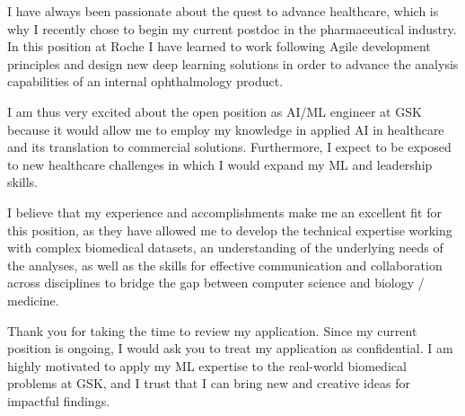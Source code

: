\documentclass[10pt, letter]{ag-cv} %
\begin{document}
\begin{cvletter}
\begin{flushleft}
I have always been passionate about the quest to advance healthcare, which is why I recently chose to begin my current postdoc in the pharmaceutical industry. In this position at Roche I have learned to work following Agile development principles and design new deep learning solutions in order to advance the analysis capabilities of an internal ophthalmology product. 

I am thus very excited about the open position as AI/ML engineer at GSK because it would allow me to employ my knowledge in applied AI in healthcare and its translation to commercial solutions. Furthermore, I expect to be exposed to new healthcare challenges in which I would expand my ML and leadership skills. 

I believe that my experience and accomplishments make me an excellent fit for this position, as they have allowed me to develop the technical expertise working with complex biomedical datasets, an understanding of the underlying needs of the analyses, as well as the skills for effective communication and collaboration across disciplines to bridge the gap between computer science and biology / medicine. 

Thank you for taking the time to review my application. Since my current position is ongoing, I would ask you to treat my application as confidential. I am highly motivated to apply my ML expertise to the real-world biomedical problems at GSK, and I trust that I can bring new and creative ideas for impactful findings.


\end{flushleft}

\end{cvletter}


\makeletterclosing %
\end{document}
